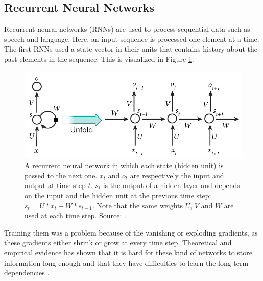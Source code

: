 \documentclass[a4paper]{article}
\begin{document}
\subsection{Recurrent Neural Networks}
Recurrent neural networks (RNNs) are used to process sequential data such as speech and language. Here, an input sequence is processed one element at a time. The first RNNs used a state vector in their units that contains history about the past elements in the sequence. This is visualized in Figure \ref{fig:rnnunrolled}.
\begin{figure}[H]
\includegraphics[width=\linewidth]{images/RNN-unrolled.jpg} %
\caption{A recurrent neural network in which each state (hidden unit) is passed to the next one. $x_t$ and $o_t$ are respectively the input and output at time step $t$. $s_t$ is the output of a hidden layer and depends on the input and the hidden unit at the previous time step: $s_t = U*x_t + W*s_{t-1}$. Note that the same weights $U$, $V$ and $W$ are used at each time step. Source: \cite{LeCun2015DeepLearning}.}
\label{fig:rnnunrolled}
\end{figure}

Training them was a problem because of the vanishing or exploding gradients, as these gradients either shrink or grow at every time step. Theoretical and empirical evidence has shown that it is hard for these kind of networks to store information long enough and that they have difficulties to learn the long-term dependencies \citep{bengio1994learning}.\\ %
\end{document}

